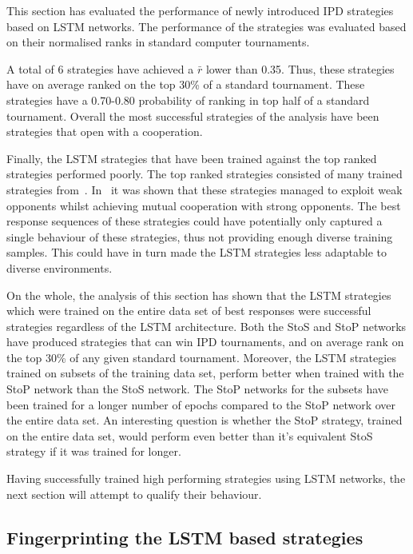 This section has evaluated the performance of \lstmstrategies newly introduced
IPD strategies based on LSTM networks. The performance of the strategies was
evaluated based on their normalised ranks in \metatournamentslstm standard
computer tournaments.

A total of 6 strategies have achieved a \(\bar{r}\) lower than 0.35. Thus, these
strategies have on average ranked on the top 30\% of a standard tournament.
These strategies have a 0.70-0.80 probability of ranking in top half of a
standard tournament. Overall the most successful strategies of the analysis have
been strategies that open with a cooperation.

Finally, the LSTM strategies that have been trained against the top ranked
strategies performed poorly. The top ranked strategies consisted of many trained
strategies from~\cite{Harper2017}. In~\cite{Harper2017} it was shown that these
strategies managed to exploit weak opponents whilst achieving mutual cooperation
with strong opponents. The best response sequences of these strategies could
have potentially only captured a single behaviour of these strategies, thus not
providing enough diverse training samples. This could have in turn made the LSTM
strategies less adaptable to diverse environments.

On the whole, the analysis of this section has shown that
the LSTM strategies
which were trained on the entire data set of best responses were successful
strategies regardless of the LSTM architecture. Both the StoS and StoP networks
have produced strategies that can win IPD tournaments, and on average rank on
the top 30\% of any given standard tournament. Moreover, the LSTM strategies
trained on subsets of the training data set, perform better when trained with
the StoP network than the StoS network. The StoP networks for the subsets have
been trained for a longer number of epochs compared to the StoP network over the
entire data set. An interesting question is whether the StoP strategy, trained
on the entire data set, would perform even better than it's equivalent StoS
strategy if it was trained for longer.

Having successfully trained high performing strategies using LSTM networks, 
the next section will attempt to qualify their behaviour.

\subsection{Fingerprinting the LSTM based strategies}

